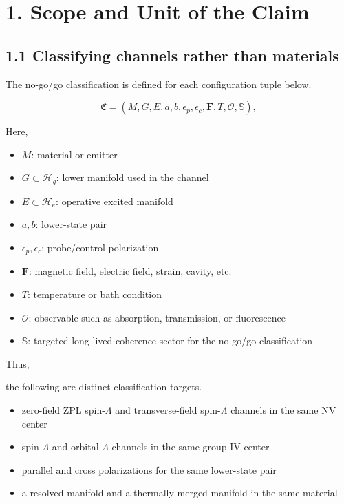 \documentclass[
  10pt,
  a4paper,
]{article}
\providecommand{\tightlist}{%
  \setlength{\itemsep}{0pt}\setlength{\parskip}{0pt}}
\begin{document}
\section{1. Scope and Unit of the
Claim}\label{scope-and-unit-of-the-claim}

\subsection{1.1 Classifying channels rather than
materials}\label{classifying-channels-rather-than-materials}

The no-go/go classification is defined for each configuration tuple
below.

\[
\mathfrak C=
(M,G,E,a,b,\epsilon_p,\epsilon_c,\mathbf F,T,\mathcal O,\mathbb S),
\]

Here,

\begin{itemize}
\tightlist
\item
  \(M\): material or emitter
\item
  \(G\subset\mathcal H_g\): lower manifold used in the channel
\item
  \(E\subset\mathcal H_e\): operative excited manifold
\item
  \(a,b\): lower-state pair
\item
  \(\epsilon_p,\epsilon_c\): probe/control polarization
\item
  \(\mathbf F\): magnetic field, electric field, strain, cavity, etc.
\item
  \(T\): temperature or bath condition
\item
  \(\mathcal O\): observable such as absorption, transmission, or
  fluorescence
\item
  \(\mathbb S\): targeted long-lived coherence sector for the no-go/go
  classification
\end{itemize}

Thus,

the following are distinct classification targets.

\begin{itemize}
\tightlist
\item
  zero-field ZPL spin-\(\Lambda\) and transverse-field spin-\(\Lambda\)
  channels in the same NV center
\item
  spin-\(\Lambda\) and orbital-\(\Lambda\) channels in the same group-IV
  center
\item
  parallel and cross polarizations for the same lower-state pair
\item
  a resolved manifold and a thermally merged manifold in the same
  material
\end{itemize}
\end{document}
